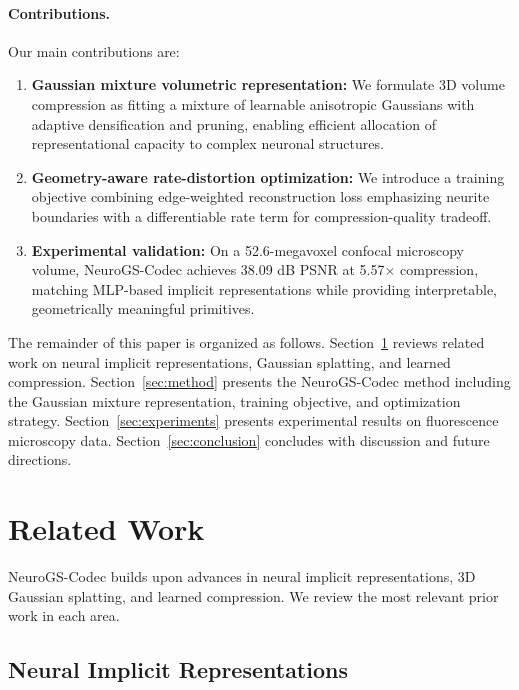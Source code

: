 \documentclass[11pt,a4paper]{article}
\begin{document}
\paragraph{Contributions.} Our main contributions are:
\begin{enumerate}
    \item \textbf{Gaussian mixture volumetric representation:} We formulate 3D volume compression as fitting a mixture of learnable anisotropic Gaussians with adaptive densification and pruning, enabling efficient allocation of representational capacity to complex neuronal structures.
    
    \item \textbf{Geometry-aware rate-distortion optimization:} We introduce a training objective combining edge-weighted reconstruction loss emphasizing neurite boundaries with a differentiable rate term for compression-quality tradeoff.
    
    \item \textbf{Experimental validation:} On a 52.6-megavoxel confocal microscopy volume, NeuroGS-Codec achieves 38.09 dB PSNR at 5.57$\times$ compression, matching MLP-based implicit representations while providing interpretable, geometrically meaningful primitives.
\end{enumerate}

The remainder of this paper is organized as follows. Section~\ref{sec:related_work} reviews related work on neural implicit representations, Gaussian splatting, and learned compression. Section~\ref{sec:method} presents the NeuroGS-Codec method including the Gaussian mixture representation, training objective, and optimization strategy. Section~\ref{sec:experiments} presents experimental results on fluorescence microscopy data. Section~\ref{sec:conclusion} concludes with discussion and future directions.

\section{Related Work}
\label{sec:related_work}

NeuroGS-Codec builds upon advances in neural implicit representations, 3D Gaussian splatting, and learned compression. We review the most relevant prior work in each area.

\subsection{Neural Implicit Representations}
\end{document}
